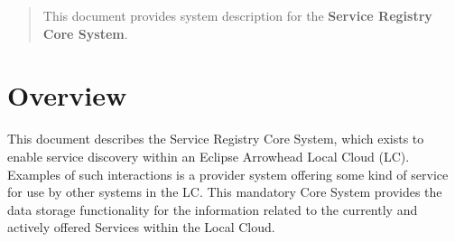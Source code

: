 \documentclass[a4paper]{arrowhead}
\begin{document}
\ArrowheadDate{\today}
\ArrowheadSetup

\begin{center}
  \vspace*{1cm}
  \huge{\arrowtitle}

  \vspace*{0.2cm}
  \LARGE{\arrowtype}
  \vspace*{1cm}

  \vspace*{\fill}


  \vspace*{1cm}
  \vspace*{\fill}

  \begin{abstract}
    This document provides system description for the \textbf{Service Registry Core System}.
  \end{abstract}

  \vspace*{1cm}

 \end{center}

\newpage

\tableofcontents
\newpage

\section{Overview}
\label{sec:overview}
\color{black}
This document describes the Service Registry Core System, which exists to enable service discovery within an Eclipse Arrowhead Local Cloud (LC). Examples of such interactions is a provider system offering some kind of service for use by other systems in the LC. This mandatory Core System provides the data storage functionality for the information related to the currently and actively offered Services within the Local Cloud.
\end{document}

